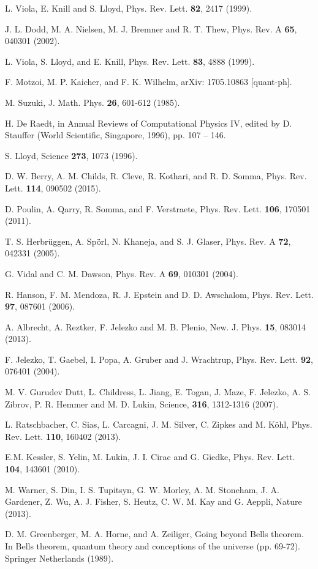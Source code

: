 \documentclass[aps,twocolumn,amsmath,amssymb,nofootinbib,superscriptaddress]{revtex4-1}
\begin{document}
\begin{thebibliography}{99}
 L. Viola, E. Knill and S. Lloyd, Phys. Rev. Lett. \textbf{82}, 2417 (1999).

 J. L. Dodd, M. A. Nielsen, M. J. Bremner and R. T. Thew, Phys. Rev. A \textbf{65}, 040301 (2002). 


 L. Viola, S. Lloyd, and E. Knill, Phys. Rev. Lett. \textbf{83}, 4888 (1999).  


 F. Motzoi, M. P. Kaicher, and F. K. Wilhelm, arXiv: 1705.10863 [quant-ph].

 M. Suzuki, J. Math. Phys. \textbf{26}, 601-612 (1985).


 H. De Raedt, in Annual Reviews of Computational Physics IV, edited by D. Stauffer (World Scientific, Singapore, 1996), pp. 107 – 146.

 S. Lloyd, Science \textbf{273}, 1073 (1996).

 D. W. Berry, A. M. Childs, R. Cleve, R. Kothari, and R. D. Somma, Phys. Rev. Lett. \textbf{114}, 090502 (2015).

 D. Poulin, A. Qarry, R. Somma, and F. Verstraete, Phys. Rev. Lett. \textbf{106}, 170501 (2011).  

 T. S. Herbr\"uggen, A. Sp\"orl, N. Khaneja, and S. J. Glaser, Phys. Rev. A \textbf{72}, 042331 (2005).


 G. Vidal and C. M. Dawson, Phys. Rev. A \textbf{69}, 010301 (2004).


 R. Hanson, F. M. Mendoza, R. J. Epstein and D. D. Awschalom,
Phys. Rev. Lett. \textbf{97}, 087601 (2006). 
 
 A.
Albrecht, A. Reztker, F. Jelezko and M. B. Plenio, New. J. Phys.
\textbf{15}, 083014 (2013). 
 
 F. Jelezko, T. Gaebel, I. Popa, A.
Gruber and J. Wrachtrup, Phys. Rev. Lett. \textbf{92}, 076401 (2004).

 M. V. Gurudev Dutt, L. Childress, L. Jiang, E. Togan, J.
Maze, F. Jelezko, A. S. Zibrov, P. R. Hemmer and M. D. Lukin, Science,
\textbf{316}, 1312-1316 (2007).  

 L. Ratschbacher, C.
Sias, L. Carcagni, J. M. Silver, C. Zipkes and M. K\"ohl, Phys. Rev. Lett.
\textbf{110}, 160402 (2013).  

 E.M. Kessler, S.
Yelin, M. Lukin, J. I. Cirac and G. Giedke, Phys. Rev. Lett. \textbf{104},
143601 (2010). 
 
 M. Warner, S. Din, I. S. Tupitsyn, G. W. Morley, A. M. Stoneham, J. A. Gardener, Z. Wu,
A. J. Fisher, S. Heutz, C. W. M. Kay and G. Aeppli, Nature (2013).


 D. M. Greenberger, M. A. Horne, and A. Zeiliger, Going beyond Bells theorem. In Bells theorem, quantum theory and conceptions of the universe (pp. 69-72). Springer Netherlands (1989).


%

%
%
%
\end{thebibliography}
\end{document}
